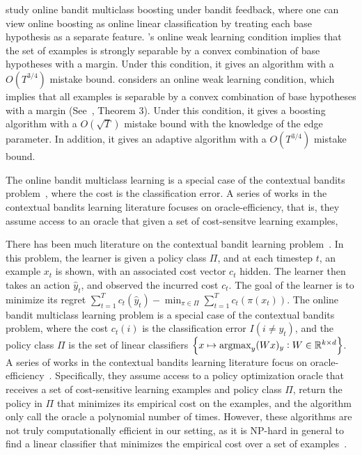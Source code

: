 \cite{Chen-Lin-Lu-2014, Zhang-Jung-Tewari-2018} study online bandit multiclass
boosting under bandit feedback, where one can view online boosting as online
linear classification by treating each base hypothesis as a separate feature.
\cite{Chen-Lin-Lu-2014}'s online weak learning condition implies that
the set of examples is strongly separable by a convex combination of base hypotheses
with a margin. Under this condition, it gives an algorithm with a $O(T^{3/4})$
mistake bound. \cite{Zhang-Jung-Tewari-2018} considers an online weak learning
condition, which implies that all examples is separable by a convex combination of base hypotheses with a margin (See~\cite{Mukherjee-Schapire-2013}, Theorem 3).
Under this condition, it gives
a boosting algorithm with a $O(\sqrt{T})$ mistake bound with the knowledge of the edge
parameter. In addition, it gives an adaptive algorithm with a $O(T^{3/4})$
mistake bound.

The online bandit multiclass learning is a special case of the contextual bandits
problem~\cite{Auer-2003, Langford-Zhang-2008}, where the cost is the classification error.
A series of works in the contextual bandits learning literature focuses on
oracle-efficiency, that is, they assume access to an
oracle that given a set of cost-sensitve learning examples,

There has been much literature on the contextual bandit learning problem~\citep{Auer-2003, Langford-Zhang-2007}.
In this problem, the learner is given a policy class $\Pi$, and
at each timestep $t$, an example $x_t$ is shown, with an associated cost vector $c_t$ hidden.
The learner then takes an action $\hat{y}_t$, and observed the incurred cost $c_t$.
The goal of the learner is to minimize its regret $\sum_{t=1}^T c_t(\hat{y}_t) - \min_{\pi \in \Pi} \sum_{t=1}^T c_t(\pi(x_t))$.
The online bandit multiclass learning problem is a special case of the contextual bandits problem,
where the cost $c_t(i)$ is the classification error $I(i \neq y_t)$,
and the policy class $\Pi$ is the set of linear classifiers
$\cbr{x \mapsto \argmax_y (Wx)_y: W \in \R^{k \times d}}$.
A series of works in the contextual bandits learning literature focus on
oracle-efficiency~\citep{DudikHKKLRZ11, Monster:2014, RakhlinS16, Syrgkanis2016a, Syrgkanis2016b}.
Specifically, they assume access to a policy optimization
oracle that receives a set of cost-sensitive learning examples and policy class $\Pi$,
return the policy in $\Pi$ that minimizes its empirical cost on the examples, and the algorithm
only call the oracle a polynomial number of times.
However, these algorithms are not truly computationally efficient in our setting,
as it is NP-hard in general to find a linear classifier that minimizes the empirical cost over a set of examples~\citep{arora1997hardness}.

